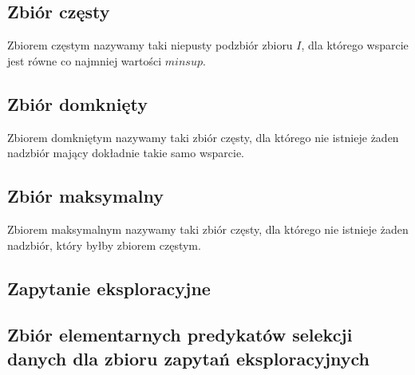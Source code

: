 \subsection{Zbiór częsty}
\label{c226}
Zbiorem częstym nazywamy taki niepusty podzbiór zbioru \(I\), dla którego wsparcie jest równe co najmniej wartości \(minsup\).

\subsection{Zbiór domknięty}
\label{c227}
Zbiorem domkniętym nazywamy taki zbiór częsty, dla którego nie istnieje żaden nadzbiór mający dokładnie takie samo wsparcie.

\subsection{Zbiór maksymalny}
\label{c228}
Zbiorem maksymalnym nazywamy taki zbiór częsty, dla którego nie istnieje żaden nadzbiór, który byłby zbiorem częstym.

\subsection{Zapytanie eksploracyjne}
\label{c229}

\subsection{Zbiór elementarnych predykatów selekcji danych dla zbioru zapytań eksploracyjnych}
\label{c2210}